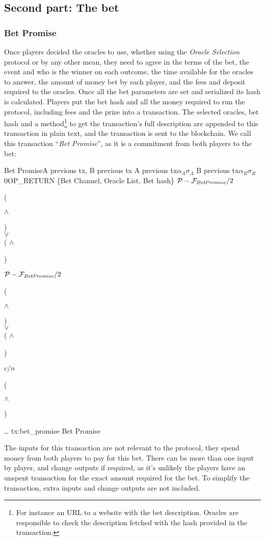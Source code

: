 \subsection{Second part: The bet}

\subsubsection{Bet Promise}
Once players decided the oracles to use, whether using the \textit{Oracle
  Selection} protocol or by any other mean, they need to agree in the terms of
  the bet, the event and who is the winner on each outcome, the time available
  for the oracles to answer, the amount of money bet by each player, and the
  fees and deposit required to the oracles.
Once all the bet parameters are set and serialized its hash is calculated.
Players put the bet hash and all the money required to run the protocol,
  including fees and the prize into a transaction.
The selected oracles, bet hash and a method\footnote{For instance an URL to a
  website with the bet description. Oracles are responsible to check the
  description fetched with the hash provided in the transaction.} to get the
  transaction's full description are appended to this transaction in plain text,
  and the transaction is sent to the blockchain.
We call this transaction ``\textit{Bet Promise}'', as it is a commitment from both
  players to the bet:

\transaction
    {Bet Promise}{A previous tx, B previous tx}
    {A previous tx}{$\alpha_A$}{$\sigma_A$}
    {B previous tx}{$\alpha_B$}{$\sigma_B$}
    \stopinputs
    {0}{\footnotesize{OP\_RETURN \{Bet Channel, Oracle List, Bet hash\}}}
    {$\mathcal{P} - \mathcal{F}_{\mathit{Bet Promise}} / 2$}{(\signature{A} $\wedge$ \signature{B}) \\
                                                   $\vee$ \\
                                            ( $\wedge$ \signature{A}) }
    {$\mathcal{P} - \mathcal{F}_{\mathit{Bet Promise}} / 2$}{(\signature{A} $\wedge$ \signature{B}) \\
                                                   $\vee$ \\
                                            ( $\wedge$ \signature{B}) }
    {$c/n$}{(\signature{A} $\wedge$ \signature{B})}
    {\ldots }{}
    \stopoutputs
    {tx:bet_promise}
    {Bet Promise}

The inputs for this transaction are not relevant to the protocol, they spend
  money from both players to pay for this bet.
There can be more than one input by player, and change outputs if required,
as it's unlikely the players have an unspent transaction for the exact amount
  required for the bet.
To simplify the transaction, extra inputs and change outputs are not included.

